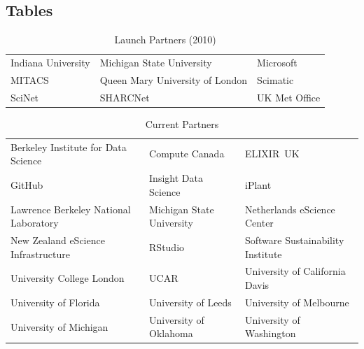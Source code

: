 \documentclass[10pt,a4paper,twocolumn]{article}
\begin{document}
\subsection*{Tables}

\begin{table}
\begin{tabular}{lll}
Indiana University & Michigan State University & Microsoft \\
MITACS & Queen Mary University of London & Scimatic \\
SciNet & SHARCNet & UK Met Office
\end{tabular}
\caption{Launch Partners (2010)}
\label{t:launch-partners}
\end{table}

\begin{table}
\begin{tabular}{lll}
Berkeley Institute for Data Science & Compute Canada & ELIXIR~UK \\
GitHub & Insight Data Science & iPlant \\
Lawrence Berkeley National Laboratory & Michigan State University & Netherlands eScience Center \\
New Zealand eScience Infrastructure & RStudio & Software Sustainability Institute \\
University College London & UCAR & University of California Davis \\
University of Florida & University of Leeds & University of Melbourne \\
University of Michigan & University of Oklahoma & University of Washington
\end{tabular}
\caption{Current Partners}
\label{t:current-partners}
\end{table}
\end{document}
